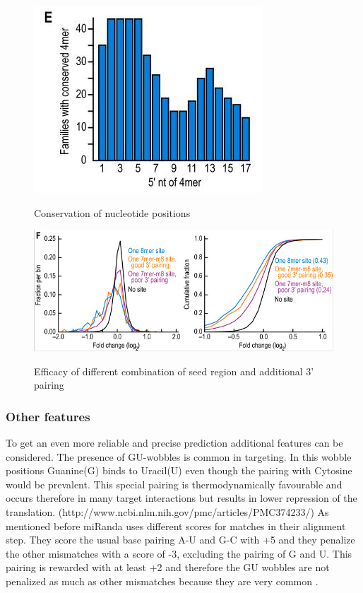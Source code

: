 \documentclass[12pt]{article}
\begin{document}
\begin{figure}
\centering
\includegraphics[scale=0.5]{results/sites_conserved.PNG} 
\label{conserved}
\caption{Conservation of nucleotide positions}
\end{figure}

\begin{figure}
\centering
\includegraphics[scale=0.5]{results/site_efficacy.PNG} 
\label{efficacy}
\caption{Efficacy of different combination of seed region and additional 3' pairing}
\end{figure}



\subsubsection{Other features}
To get an even more reliable and precise prediction additional features can be considered. The presence of GU-wobbles is common in targeting. In this wobble positions Guanine(G) binds to Uracil(U) even though the pairing with Cytosine would be prevalent. This special pairing is thermodynamically favourable and occurs therefore in many target interactions but results in lower repression of the translation. (http://www.ncbi.nlm.nih.gov/pmc/articles/PMC374233/) As mentioned before miRanda uses different scores for matches in their alignment step. They score the usual base pairing A-U and G-C with +5 and they penalize the other mismatches with a score of -3, excluding the pairing of G and U. This pairing is rewarded with at least +2 and therefore the GU wobbles are not penalized as much as other mismatches because they are very common \cite{Enright}.
 
\end{document}
